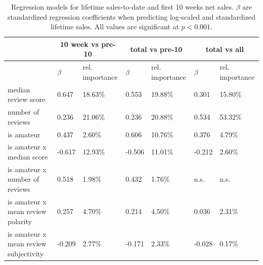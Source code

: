 \documentclass{sig-alternate}
\begin{document}
\begin{table}[tb]
\centering
\small
\sffamily
\begin{tabular}{lllllll}
& \multicolumn{2}{c}{\textbf{10 week vs pre-10}} & \multicolumn{2}{c}{\textbf{total vs pre-10}} & \multicolumn{2}{c}{\textbf{total vs all}}\\ 
\midrule & \textbf{$\beta$} & rel. importance & \textbf{$\beta$} & rel.
importance & \textbf{$\beta$} & rel. importance\\ 
median review score & 0.647 & 18.63\% & 0.553 & 19.88\% & 0.301 & 15.80\%\\ 
number of reviews & 0.236 & 21.06\% & 0.236 & 20.88\% & 0.534 & 53.32\%\\ 
is amateur & 0.437 & 2.60\% & 0.606 & 10.76\% & 0.376 & 4.79\%\\ 
is amateur x median score  & -0.617 & 12.93\% & -0.506 & 11.01\% & -0.212 & 2.60\%\\  
is amateur x number of reviews & 0.518 & 1.98\% & 0.432 & 1.76\% & n.s. & n.s. \\ 
is amateur x mean review polarity & 0.257 & 4.70\% & 0.214 & 4.50\% & 0.036 & 2.31\%\\ 
is amateur x mean review subjectivity & -0.209 & 2.77\% & -0.171 & 2.33\% & -0.028 & 0.17\%\\ 

\end{tabular}
\caption{Regression models for lifetime sales-to-date and first 10 weeks net sales. $\beta$ are standardized regression coefficients when predicting log-scaled and standardized lifetime sales. All values are significant at $p < 0.001$.}
\label{tab:sales_allmodel_lm}
\end{table}

\end{document}
